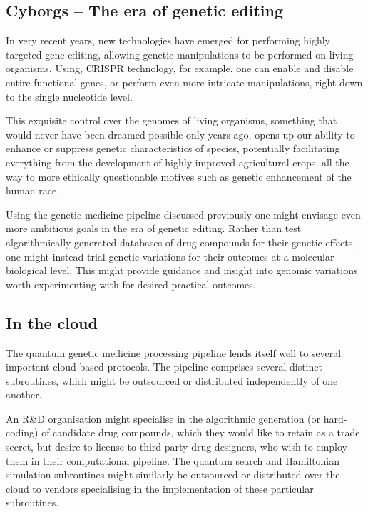 %
%

\subsection{Cyborgs -- The era of genetic editing}

In very recent years, new technologies have emerged for performing highly targeted gene editing, allowing genetic manipulations to be performed on living organisms. Using, CRISPR technology, for example, one can enable and disable entire functional genes, or perform even more intricate manipulations, right down to the single nucleotide level.

This exquisite control over the genomes of living organisms, something that would never have been dreamed possible only years ago, opens up our ability to enhance or suppress genetic characteristics of species, potentially facilitating everything from the development of highly improved agricultural crops, all the way to more ethically questionable motives such as genetic enhancement of the human race.

Using the genetic medicine pipeline discussed previously one might envisage even more ambitious goals in the era of genetic editing. Rather than test algorithmically-generated databases of drug compounds for their genetic effects, one might instead trial genetic variations for their outcomes at a molecular biological level. This might provide guidance and insight into genomic variations worth experimenting with for desired practical outcomes.

%
%

\subsection{In the cloud}

The quantum genetic medicine processing pipeline lends itself well to several important cloud-based protocols. The pipeline comprises several distinct subroutines, which might be outsourced or distributed independently of one another.

An R\&D organisation might specialise in the algorithmic generation (or hard-coding) of candidate drug compounds, which they would like to retain as a trade secret, but desire to license to third-party drug designers, who wish to employ them in their computational pipeline. The quantum search and Hamiltonian simulation subroutines might similarly be outsourced or distributed over the cloud to vendors specialising in the implementation of these particular subroutines.

